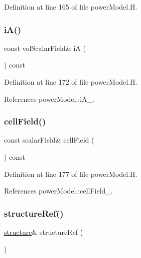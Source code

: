 Definition at line 165 of file power\+Model.\+H.

\mbox{\label{classFoam_1_1powerModel_ae2c1c1e4f41f42a4dd77007cb706089c}} 
\subsubsection{\texorpdfstring{i\+A()}{iA()}}
{\footnotesize\ttfamily const vol\+Scalar\+Field\& iA (\begin{DoxyParamCaption}{ }\end{DoxyParamCaption}) const\hspace{0.3cm}{\ttfamily [inline]}}



Definition at line 172 of file power\+Model.\+H.



References power\+Model\+::i\+A\+\_\+.

\mbox{\label{classFoam_1_1powerModel_ae8f5b544e0f8476f028acef828b4dcb2}} 
\subsubsection{\texorpdfstring{cell\+Field()}{cellField()}}
{\footnotesize\ttfamily const scalar\+Field\& cell\+Field (\begin{DoxyParamCaption}{ }\end{DoxyParamCaption}) const\hspace{0.3cm}{\ttfamily [inline]}}



Definition at line 177 of file power\+Model.\+H.



References power\+Model\+::cell\+Field\+\_\+.

\mbox{\label{classFoam_1_1powerModel_aa5041e12a8edbcdfa4effcbd1b793cfb}} 
\subsubsection{\texorpdfstring{structure\+Ref()}{structureRef()}}
{\footnotesize\ttfamily \hyperlink{classFoam_1_1structure}{structure}\& structure\+Ref (\begin{DoxyParamCaption}{ }\end{DoxyParamCaption})\hspace{0.3cm}{\ttfamily [inline]}}



